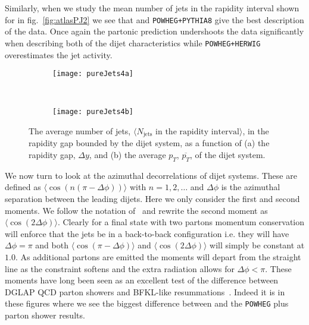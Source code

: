 	Similarly, when we study the mean number of jets in the rapidity interval shown for in
	fig.~\eqref{fig:atlasPJ2} we see that \HEJA and \texttt{POWHEG+PYTHIA8} give the best
	description of the data.  Once again the partonic \HEJ prediction undershoots the data
	significantly when describing both of the dijet characteristics while \texttt{POWHEG+HERWIG}
	overestimates the jet activity.

	\begin{figure}[bth]
		\begin{subfigure}[b]{0.48\textwidth}
			\texttt{[image: pureJets4a]}
			\caption{}
			\label{fig:}
		\end{subfigure}
		~
		\begin{subfigure}[b]{0.48\textwidth}
			\texttt{[image: pureJets4b]}
			\caption{}
			\label{fig:}
		\end{subfigure}
		\caption{The average number of jets, $\langle N_{\text{jets}}
		\text{ in the rapidity interval}\rangle$, in the rapidity gap
		         bounded by the dijet system, as a function of (a) the
		         rapidity gap, $\Delta y$, and (b) the average $p_T$,
		         $\overline{p_T}$, of the dijet system.}
		\label{fig:atlasPJ2}
	\end{figure}

	We now turn to look at the azimuthal decorrelations of dijet systems.  These are defined
	as $\langle\cos(n(\pi-\Delta\phi))\rangle$ with $n=1, 2, \ldots$ and $\Delta\phi$ is the azimuthal separation between the leading dijets.  Here we only consider
	the first and second moments.  We follow the notation of~\cite{Aad:2014pua}
	and rewrite the second moment as $\langle\cos(2\Delta\phi)\rangle$.  Clearly for a final state
	with two partons momentum conservation will enforce that the jets be in a back-to-back configuration
	i.e. they will have $\Delta \phi=\pi$ and both $\langle\cos(\pi-\Delta\phi)\rangle$ and
	$\langle\cos(2\Delta\phi)\rangle$ will simply be constant at $1.0$.  As additional
	partons are emitted the moments will depart from the straight line as the constraint softens
	and the extra radiation allows for $\Delta\phi<\pi$.  These moments have long been seen
	as an excellent test of the difference between DGLAP QCD parton showers and BFKL-like
	resummations~\cite{Ducloue:2012bm}.  Indeed it is in these figures where we see the biggest
	difference between \HEJ and the \texttt{POWHEG} plus parton shower results.

